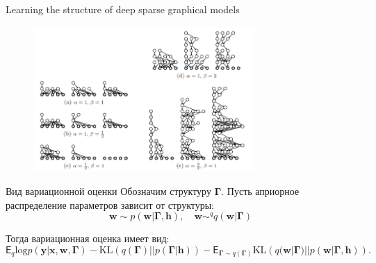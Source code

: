 \documentclass[10pt,pdf,utf8,russian,aspectratio=169]{beamer}
\begin{document}
\begin{frame}{Learning the structure of deep sparse graphical models}
\begin{figure}
\includegraphics[width=0.75\textwidth]{buffet.png}
\end{figure}

\end{frame}

\begin{frame}{Вид вариационной оценки}
Обозначим структуру $\boldsymbol{\Gamma}$.
Пусть априорное распределение параметров зависит от структуры:
$$\mathbf{w} \sim p(\mathbf{w}|\boldsymbol{\Gamma}, \mathbf{h}), \quad \mathbf{w} \sim^q q(\mathbf{w}|\boldsymbol{\Gamma})$$

Тогда вариационная оценка имеет вид:
\[
    \mathsf{E}_q \text{log}p(\mathbf{y}|\mathbf{x}, \mathbf{w}, \boldsymbol{\Gamma}) - \text{KL}\left(q(\boldsymbol{\Gamma})||p(\boldsymbol{\Gamma}|\mathbf{h})\right) - \mathsf{E}_{\boldsymbol{\Gamma} \sim q(\boldsymbol{\Gamma})}\text{KL} \left (q(\mathbf{w}|\boldsymbol{\Gamma})||p(\mathbf{w}|\boldsymbol{\Gamma}, \mathbf{h})\right).
\]
\end{frame}
\end{document}
